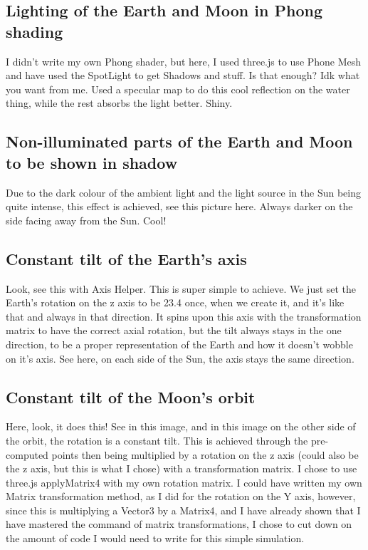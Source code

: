 \documentclass[12pt]{article}
\begin{document}
\subsection{Lighting of the Earth and Moon in Phong shading}
I didn't write my own Phong shader, but here, I used three.js to use Phone Mesh and have used the SpotLight to get Shadows and stuff. Is that enough? Idk what you want from me. Used a specular map to do this cool reflection on the water thing, while the rest absorbs the light better. Shiny.

\subsection{Non-illuminated parts of the Earth and Moon to be shown in shadow}
Due to the dark colour of the ambient light and the light source in the Sun being quite intense, this effect is achieved, see this picture here. Always darker on the side facing away from the Sun. Cool!

\subsection{Constant tilt of the Earth's axis}
Look, see this with Axis Helper. This is super simple to achieve. We just set the Earth's rotation on the z axis to be 23.4 once, when we create it, and it's like that and always in that direction. It spins upon this axis with the transformation matrix to have the correct axial rotation, but the tilt always stays in the one direction, to be a proper representation of the Earth and how it doesn't wobble on it's axis. See here, on each side of the Sun, the axis stays the same direction.

\subsection{Constant tilt of the Moon's orbit}
Here, look, it does this! See in this image, and in this image on the other side of the orbit, the rotation is a constant tilt. This is achieved through the pre-computed points then being multiplied by a rotation on the z axis (could also be the z axis, but this is what I chose) with a transformation matrix. I chose to use three.js applyMatrix4 with my own rotation matrix. I could have written my own Matrix transformation method, as I did for the rotation on the Y axis, however, since this is multiplying a Vector3 by a Matrix4, and I have already shown that I have mastered the command of matrix transformations, I chose to cut down on the amount of code I would need to write for this simple simulation.
\end{document}

